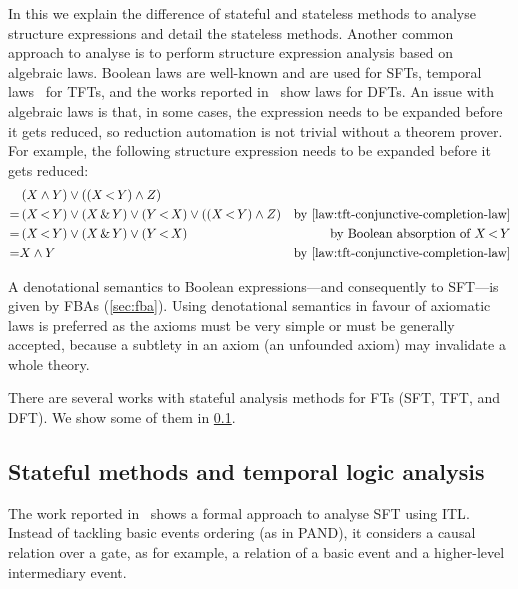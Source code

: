 \documentclass[12pt,openright,twoside,a4paper,oldfontcommands,english,brazil,final]{abntex2}
\theoremstyle{theo}
\newcommand{\parsin}[1]{\ensuremath\left( #1 \right)}
\def\pand{\ensuremath\operatorname{<}}
\def\sand{\ensuremath\operatorname{\&}}
\begin{document}
In this  we explain the difference of stateful and stateless methods to analyse structure expressions and detail the stateless methods.
Another common approach to analyse  is to perform structure expression analysis based on algebraic laws.
Boolean laws are well-known and are used for \acp{SFT}, temporal laws~\cite{Walker2009,WP2010} for \acp{TFT}, and the works reported in~\cite{Merle2010,MRL2011} show laws for \acp{DFT}.
An issue with algebraic laws is that, in some cases, the expression needs to be expanded before it gets reduced, so reduction automation is not trivial without a theorem prover.
For example, the following  structure expression needs to be expanded \cite{WP2010} before it gets reduced:
\begin{align*}
  & \parsin{X \land Y} \lor \parsin{\parsin{X \pand Y} \land Z} &\\
  = & \parsin{X \pand Y} \lor \parsin{X \sand Y} \lor \parsin{Y \pand X} \lor \parsin{\parsin{X \pand Y} \land Z} & \text{by \cref{law:tft-conjunctive-completion-law}}\\
  = & \parsin{X \pand Y} \lor \parsin{X \sand Y} \lor \parsin{Y \pand X} & \text{by Boolean absorption of } X \pand Y\\
  = & X \land Y & \text{by \cref{law:tft-conjunctive-completion-law}}
\end{align*}

A denotational semantics to Boolean expressions---and consequently to \ac{SFT}---is given by \acp{FBA} (\cref{sec:fba}).
Using denotational semantics in favour of axiomatic laws is preferred as the axioms must be very simple or must be generally accepted, because a subtlety in an axiom (an unfounded axiom) may invalidate a whole theory.

There are several works with stateful analysis methods for \acp{FT} (\ac{SFT}, \ac{TFT}, and \ac{DFT}).
We show some of them in \cref{sec:ft-stateful-analysis-methods}.

\subsection{Stateful methods and temporal logic analysis}
\label{sec:ft-stateful-analysis-methods}

The work reported in~\cite{STR2002} shows a formal approach to analyse \ac{SFT} using \ac{ITL}.
Instead of tackling basic events ordering (as in \ac{PAND}), it considers a causal relation over a gate, as for example, a relation of a basic event and a higher-level intermediary event.
\end{document}
